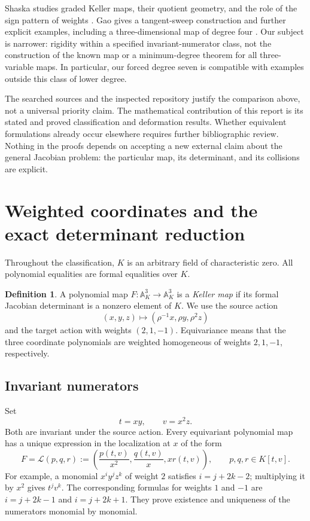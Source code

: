 \documentclass[11pt,a4paper]{article}
\numberwithin{equation}{section}
\theoremstyle{definition}
\newtheorem{definition}[theorem]{Definition}
\theoremstyle{remark}
\newcommand{\A}{\mathbb{A}}
\begin{document}
Shaska studies graded Keller maps, their quotient geometry, and the role of
the sign pattern of weights \cite{shaska}. Gao gives a tangent-sweep
construction and further explicit examples, including a three-dimensional
map of degree four \cite{gao}. Our subject is narrower: rigidity within a
specified invariant-numerator class, not the construction of the known map
or a minimum-degree theorem for all three-variable maps. In particular, our
forced degree seven is compatible with examples outside this class of lower
degree.

The searched sources and the inspected repository justify the comparison
above, not a universal priority claim. The mathematical contribution of this
report is its stated and proved classification and deformation results.
Whether equivalent formulations already occur elsewhere requires further
bibliographic review. Nothing in the proofs depends on accepting a new
external claim about the general Jacobian problem: the particular map,
its determinant, and its collisions are explicit.

\section{Weighted coordinates and the exact determinant reduction}
\label{sec:coordinates}

Throughout the classification, $K$ is an arbitrary field of characteristic
zero. All polynomial equalities are formal equalities over $K$.

\begin{definition}
A polynomial map $F:\A^3_K\to\A^3_K$ is a \emph{Keller map} if its formal
Jacobian determinant is a nonzero element of $K$. We use the source action
\[
(x,y,z)\longmapsto(\rho^{-1}x,\rho y,\rho^2z)
\]
and the target action with weights $(2,1,-1)$. Equivariance means that the
three coordinate polynomials are weighted homogeneous of weights $2,1,-1$,
respectively.
\end{definition}

\subsection{Invariant numerators}

Set
\begin{equation}\label{eq:invariants}
t=xy,\qquad v=x^2z.
\end{equation}
Both are invariant under the source action. Every equivariant polynomial
map has a unique expression in the localization at $x$ of the form
\begin{equation}\label{eq:lift}
F=\mathcal L(p,q,r)
 :=\left(\frac{p(t,v)}{x^2},\frac{q(t,v)}x,xr(t,v)\right),
\qquad p,q,r\in K[t,v].
\end{equation}
For example, a monomial $x^iy^jz^k$ of weight $2$ satisfies
$i=j+2k-2$; multiplying it by $x^2$ gives $t^jv^k$.
The corresponding formulas for weights $1$ and $-1$ are
$i=j+2k-1$ and $i=j+2k+1$. They prove existence and uniqueness of the
numerators monomial by monomial.
\end{document}
